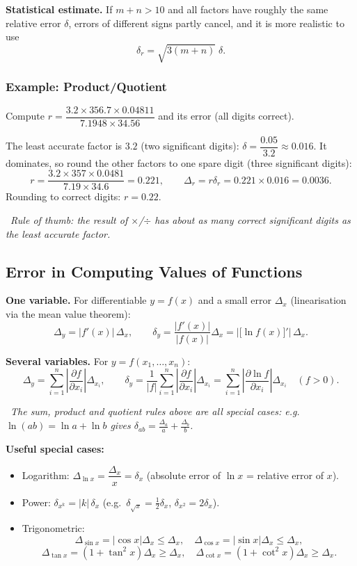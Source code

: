 \documentclass[hidelinks]{article}
\newcommand{\callout}[1]{\par\smallskip\noindent{\color{capri}$\blacktriangleright$}\ \textit{#1}\par\smallskip}
\newcommand{\abs}[1]{\left|#1\right|}
\begin{document}
\textbf{Statistical estimate.} If $m+n>10$ and all factors have roughly the same relative error $\delta$, errors of different signs partly cancel, and it is more realistic to use
\[
\delta_r=\sqrt{3(m+n)}\;\delta .
\]

\subsubsection{Example: Product/Quotient}

Compute $r=\dfrac{3.2\times356.7\times0.04811}{7.1948\times34.56}$ and its error (all digits correct).

The least accurate factor is $3.2$ (two significant digits): $\delta=\dfrac{0.05}{3.2}\approx0.016$. It dominates, so round the other factors to one spare digit (three significant digits):
\[
r=\frac{3.2\times357\times0.0481}{7.19\times34.6}=0.221,\qquad \Delta_r=r\delta_r=0.221\times0.016=0.0036.
\]
Rounding to correct digits: $r=0.22$.

\callout{Rule of thumb: the result of $\times$/$\div$ has about as many correct significant digits as the \emph{least} accurate factor.}

\subsection{Error in Computing Values of Functions}

\textbf{One variable.} For differentiable $y=f(x)$ and a small error $\Delta_x$ (linearisation via the mean value theorem):
\[
\Delta_y=\abs{f'(x)}\,\Delta_x,\qquad
\delta_y=\frac{\abs{f'(x)}}{\abs{f(x)}}\Delta_x=\abs{\big[\ln f(x)\big]'}\,\Delta_x .
\]

\textbf{Several variables.} For $y=f(x_1,\dots,x_n)$:
\[
\Delta_y=\sum_{i=1}^n\abs{\frac{\partial f}{\partial x_i}}\Delta_{x_i},\qquad
\delta_y=\frac1{\abs f}\sum_{i=1}^n\abs{\frac{\partial f}{\partial x_i}}\Delta_{x_i}=\sum_{i=1}^n\abs{\frac{\partial \ln f}{\partial x_i}}\Delta_{x_i}\quad(f>0).
\]

\callout{The sum, product and quotient rules above are all special cases: e.g.\ $\ln(ab)=\ln a+\ln b$ gives $\delta_{ab}=\frac{\Delta_a}{a}+\frac{\Delta_b}{b}$.}

\textbf{Useful special cases:}
\begin{itemize}
    \item Logarithm: $\Delta_{\ln x}=\dfrac{\Delta_x}{x}=\delta_x$ (absolute error of $\ln x$ = relative error of $x$).
    \item Power: $\delta_{x^k}=\abs{k}\,\delta_x$ (e.g.\ $\delta_{\sqrt x}=\tfrac12\delta_x$, $\delta_{x^2}=2\delta_x$).
    \item Trigonometric:
    \[
    \Delta_{\sin x}=\abs{\cos x}\Delta_x\le\Delta_x,\quad
    \Delta_{\cos x}=\abs{\sin x}\Delta_x\le\Delta_x,
    \]
    \[
    \Delta_{\tan x}=(1+\tan^2x)\Delta_x\ge\Delta_x,\quad
    \Delta_{\cot x}=(1+\cot^2x)\Delta_x\ge\Delta_x.
    \]
\end{itemize}
\end{document}
